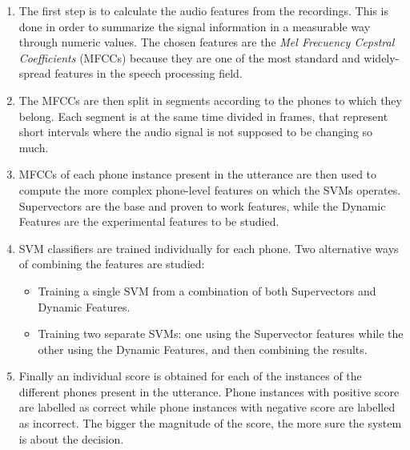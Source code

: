 \begin{enumerate}

 \item The first step is to calculate the audio features from the recordings.
 This is done in order to summarize the signal information
 in a measurable way through numeric values. The chosen features
 are the \textit{Mel Frecuency Cepstral Coefficients} (MFCCs) because they are one of the
 most standard and widely-spread features in the speech processing field.

 \item The MFCCs are then split in segments according to the phones to which they
 belong. Each segment is at the same time divided in frames, that represent short
 intervals where the audio signal is not supposed to be changing so much.

 \item MFCCs of each phone instance present in the utterance
 are then used to compute the more complex phone-level features
 on which the SVMs operates. Supervectors are the base and proven to work features,
 while the Dynamic Features are the experimental features to be studied.

 \item {
  SVM classifiers are trained individually for each phone. Two alternative ways of combining the
  features are studied:
    \begin{itemize}
      \item Training a single SVM from a combination of both Supervectors and Dynamic Features.
      \item Training two separate SVMs: one using the Supervector features while the other using the
      Dynamic Features, and then combining the results.
    \end{itemize}
 }

 \item Finally an individual score is obtained for each of the instances
 of the different phones present in the
 utterance. Phone instances with positive score are labelled as
 correct while phone instances with negative score are labelled as incorrect.
 The bigger the magnitude of the score, the more sure the system is about the
 decision.

\end{enumerate}


